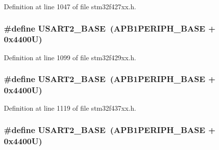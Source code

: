 Definition at line 1047 of file stm32f427xx.\+h.

\subsubsection[{\texorpdfstring{U\+S\+A\+R\+T2\+\_\+\+B\+A\+SE}{USART2_BASE}}]{\setlength{\rightskip}{0pt plus 5cm}\#define U\+S\+A\+R\+T2\+\_\+\+B\+A\+SE~({\bf A\+P\+B1\+P\+E\+R\+I\+P\+H\+\_\+\+B\+A\+SE} + 0x4400\+U)}\hypertarget{group___peripheral__memory__map_gade83162a04bca0b15b39018a8e8ec090}{}\label{group___peripheral__memory__map_gade83162a04bca0b15b39018a8e8ec090}


Definition at line 1099 of file stm32f429xx.\+h.

\subsubsection[{\texorpdfstring{U\+S\+A\+R\+T2\+\_\+\+B\+A\+SE}{USART2_BASE}}]{\setlength{\rightskip}{0pt plus 5cm}\#define U\+S\+A\+R\+T2\+\_\+\+B\+A\+SE~({\bf A\+P\+B1\+P\+E\+R\+I\+P\+H\+\_\+\+B\+A\+SE} + 0x4400\+U)}\hypertarget{group___peripheral__memory__map_gade83162a04bca0b15b39018a8e8ec090}{}\label{group___peripheral__memory__map_gade83162a04bca0b15b39018a8e8ec090}


Definition at line 1119 of file stm32f437xx.\+h.

\subsubsection[{\texorpdfstring{U\+S\+A\+R\+T2\+\_\+\+B\+A\+SE}{USART2_BASE}}]{\setlength{\rightskip}{0pt plus 5cm}\#define U\+S\+A\+R\+T2\+\_\+\+B\+A\+SE~({\bf A\+P\+B1\+P\+E\+R\+I\+P\+H\+\_\+\+B\+A\+SE} + 0x4400\+U)}\hypertarget{group___peripheral__memory__map_gade83162a04bca0b15b39018a8e8ec090}{}\label{group___peripheral__memory__map_gade83162a04bca0b15b39018a8e8ec090}


